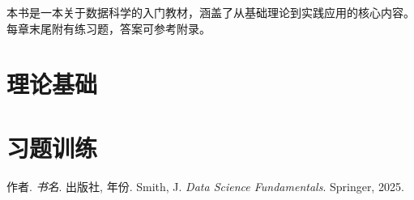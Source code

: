 \documentclass[showmark, analysis]{ExPress}
\begin{document}


\maketitle

\begin{preface}
本书是一本关于数据科学的入门教材，涵盖了从基础理论到实践应用的核心内容。
每章末尾附有练习题，答案可参考附录。
\end{preface}

\tableofcontents
\clearpage

\part{理论基础}




\part{习题训练}




\begin{appendices}

\end{appendices}

\begin{references}
 作者. \textit{书名}. 出版社, 年份.
 Smith, J. \textit{Data Science Fundamentals}. Springer, 2025.
\end{references}
\end{document}

